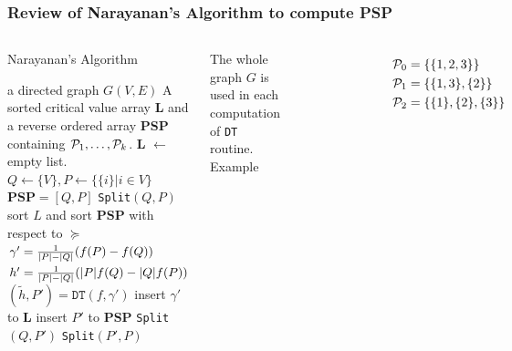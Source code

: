 \documentclass[notheorems]{beamer}
\begin{document}
\begin{frame}
\frametitle{Review of Narayanan's Algorithm to compute PSP}
\begin{columns}
\begin{algorithm}[H]
\caption*{Narayanan's Algorithm}\label{alg:psp}
{\tiny
\begin{algorithmic}[1]
\REQUIRE a directed graph $G(V,E)$
\ENSURE A sorted critical value array \textbf{L} and a reverse ordered array \textbf{PSP} containing $\P_1,\dots, \P_k$.
\STATE \textbf{L}  $\leftarrow$ empty list.
\STATE $Q\leftarrow \{V\}, P \leftarrow \{ \{i \} | i \in V\}$
\STATE $\mathbf{PSP}= [Q, P]$
\STATE \texttt{Split}$(Q,P)$
\STATE sort $L$ and sort $\mathbf{PSP}$ with respect to $\succeq$ 
 \STATE\label{alg:gamma} $\gamma' = {1 \over \abs{P} - \abs{Q}} (f(P)-f(Q))$
 \STATE $h' = {1 \over \abs{P} - \abs{Q}}(\abs{P} f(Q) - \abs{Q} f(P))$
 \STATE $(\tilde{h}, P') = \texttt{DT}(f,\gamma')$
 	\STATE insert $\gamma'$ to $\mathbf{L}$
 \ELSE
 	\STATE insert $P'$ to $\mathbf{PSP}$
 	\STATE \texttt{Split}$(Q, P')$
 	\STATE \texttt{Split}$(P',P)$
 \ENDIF
\ENDFUNCTION
\end{algorithmic}
}
\end{algorithm}
The whole graph $G$ is used in each computation of \texttt{DT} routine.
Example
\begin{figure}
\includegraphics[width=4.5cm]{pic/dt_with_graph.eps}
\end{figure}
\begin{align*}
\P_0  & = \{\{1,2,3\}\} \\
\P_1  & = \{\{1,3\},\{2\}\} \\
\P_2  & = \{\{1\},\{2\},\{3\}\} 
\end{align*}
\end{columns}
\end{frame}
\end{document}
